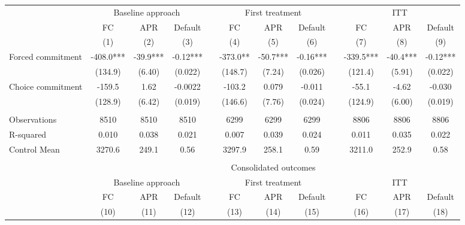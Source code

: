 \begin{tabular}{lccccccccccc}
\toprule
      & \multicolumn{3}{c}{Baseline approach} &       & \multicolumn{3}{c}{First treatment} &       & \multicolumn{3}{c}{ITT} \\
\cmidrule{2-4}\cmidrule{6-8}\cmidrule{10-12}      & FC    & APR   & Default &       & FC    & APR   & Default &       & FC    & APR   & Default \\
\midrule
      & (1)   & (2)   & (3)   &       & (4)   & (5)   & (6)   &       & (7)   & (8)   & (9) \\
\midrule
\midrule
Forced commitment & -408.0*** & -39.9*** & -0.12*** &       & -373.0** & -50.7*** & -0.16*** &       & -339.5*** & -40.4*** & -0.12*** \\
      & (134.9) & (6.40) & (0.022) &       & (148.7) & (7.24) & (0.026) &       & (121.4) & (5.91) & (0.022) \\
Choice commitment & -159.5 & 1.62  & -0.0022 &       & -103.2 & 0.079 & -0.011 &       & -55.1 & -4.62 & -0.030 \\
      & (128.9) & (6.42) & (0.019) &       & (146.6) & (7.76) & (0.024) &       & (124.9) & (6.00) & (0.019) \\
      &       &       &       &       &       &       &       &       &       &       &  \\
\midrule
Observations & 8510  & 8510  & 8510  &       & 6299  & 6299  & 6299  &       & 8806  & 8806  & 8806 \\
R-squared & 0.010 & 0.038 & 0.021 &       & 0.007 & 0.039 & 0.024 &       & 0.011 & 0.035 & 0.022 \\
Control Mean & 3270.6 & 249.1 & 0.56  &       & 3297.9 & 258.1 & 0.59  &       & 3211.0 & 252.9 & 0.58 \\
\midrule
\midrule
      &       &       &       &       &       &       &       &       &       &       &  \\
\midrule
      & \multicolumn{11}{c}{Consolidated outcomes} \\
\midrule
      & \multicolumn{3}{c}{Baseline approach} &       & \multicolumn{3}{c}{First treatment} &       & \multicolumn{3}{c}{ITT} \\
\cmidrule{2-4}\cmidrule{6-8}\cmidrule{10-12}      & FC    & APR   & Default &       & FC    & APR   & Default &       & FC    & APR   & Default \\
\midrule
      & (10)  & (11)  & (12)  &       & (13)  & (14)  & (15)  &       & (16)  & (17)  & (18) \\

\end{tabular}
